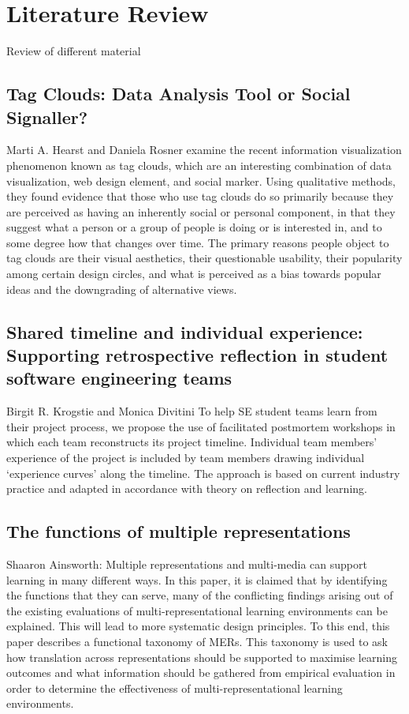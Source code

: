 \section{Literature Review}
Review of different material

\subsection{Tag Clouds: Data Analysis Tool or Social Signaller?}\cite{Hearst2008}
Marti A. Hearst and Daniela Rosner examine the recent information visualization phenomenon known as tag clouds, which are an interesting combination of data visualization, web design element, and social marker. Using qualitative methods, they found evidence that those who use tag clouds do so primarily because they are perceived as having an inherently social or personal component, in that they suggest what a person or a group of people is doing or is interested in, and to some degree how that changes over time. The primary reasons people object to tag clouds are their visual aesthetics, their questionable usability, their popularity among certain design circles, and what is perceived as a bias towards popular ideas and the downgrading of alternative views.

\subsection{Shared timeline and individual experience: Supporting retrospective reflection in student software engineering teams}\cite{Krogstie2009}
Birgit R. Krogstie and Monica Divitini To help SE student teams learn from their project process, we propose the use of facilitated postmortem workshops in which each team reconstructs its project timeline. Individual team members’ experience of the project is included by team members drawing individual ‘experience curves’ along the timeline. The approach is based on current industry practice and adapted in accordance with theory on reflection and learning.

\subsection{The functions of multiple representations}\cite{Ainsworth1999}
Shaaron Ainsworth: Multiple representations and multi-media can support learning in many different ways. In this paper, it is claimed that by identifying the functions that they can serve, many of the conflicting findings arising out of the existing evaluations of multi-representational learning environments can be explained. This will lead to more systematic design principles. To this end, this paper describes a functional taxonomy of MERs. This taxonomy is used to ask how translation across representations should be supported to maximise learning outcomes and what information should be gathered from empirical evaluation in order to determine the effectiveness of multi-representational learning environments.
